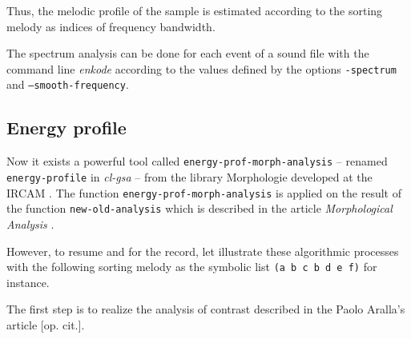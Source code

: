 Thus, the melodic profile of the sample is estimated according to the sorting melody as indices of frequency bandwidth.

\bigskip 

The spectrum analysis can be done for each event of a sound file with the command line \textsl{enkode} according to the values defined by the options \texttt{-spectrum} and \texttt{--smooth-frequency}.

\subsection{Energy profile}

Now it exists a powerful tool called \texttt{energy-prof-morph-analysis} -- renamed \texttt{energy-profile} in \textsl{cl-gsa} -- from the library Morphologie developed at the IRCAM \citep{mp}. The function \texttt{energy-prof-morph-analysis} is applied on the result of the function \texttt{new-old-analysis} which is described in the article \textit{Morphological Analysis} \citep{ma}.

\bigskip 

However, to resume and for the record, let illustrate these algorithmic processes with the following sorting melody as the symbolic list \texttt{(a b c b d e f)} for instance.

The first step is to realize the analysis of contrast described in the Paolo Aralla's article [op. cit.].

\bigskip

